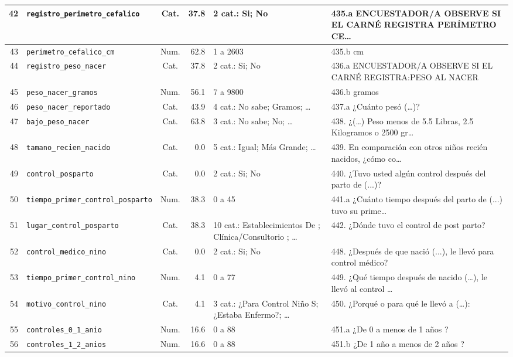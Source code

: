 \begin{longtable}{|r|p{3.1cm}|c|r|p{3.0cm}|p{3.8cm}|}
  42 & \texttt{registro\_perimetro\_cefalico} & Cat. & 37.8 & 2 cat.: Si; No & 435.a ENCUESTADOR/A OBSERVE SI EL CARNÉ REGISTRA PERÍMETRO CE… \\ \hline
  43 & \texttt{perimetro\_cefalico\_cm} & Num. & 62.8 & 1 a 2603 & 435.b cm \\ \hline
  44 & \texttt{registro\_peso\_nacer} & Cat. & 37.8 & 2 cat.: Si; No & 436.a ENCUESTADOR/A OBSERVE SI EL CARNÉ REGISTRA:PESO AL NACER \\ \hline
  45 & \texttt{peso\_nacer\_gramos} & Num. & 56.1 & 7 a 9800 & 436.b gramos \\ \hline
  46 & \texttt{peso\_nacer\_reportado} & Cat. & 43.9 & 4 cat.: No sabe; Gramos; … & 437.a ¿Cuánto pesó (…)? \\ \hline
  47 & \texttt{bajo\_peso\_nacer} & Cat. & 63.8 & 3 cat.: No sabe; No; … & 438.  ¿(…) Peso menos de 5.5 Libras, 2.5 Kilogramos o 2500 gr… \\ \hline
  48 & \texttt{tamano\_recien\_nacido} & Cat. & 0.0 & 5 cat.: Igual; Más Grande; … & 439.  En comparación con otros niños recién nacidos, ¿cómo co… \\ \hline
  49 & \texttt{control\_posparto} & Cat. & 0.0 & 2 cat.: Si; No & 440.  ¿Tuvo usted algún control después del parto de (...)? \\ \hline
  50 & \texttt{tiempo\_primer\_control\_posparto} & Num. & 38.3 & 0 a 45 & 441.a ¿Cuánto tiempo después del parto de (...) tuvo su prime… \\ \hline
  51 & \texttt{lugar\_control\_posparto} & Cat. & 38.3 & 10 cat.: Establecimientos De ; Clínica/Consultorio ; … & 442.  ¿Dónde tuvo el control de post parto? \\ \hline
  52 & \texttt{control\_medico\_nino} & Cat. & 0.0 & 2 cat.: Si; No & 448.  ¿Después de que nació (...), le llevó para control médico? \\ \hline
  53 & \texttt{tiempo\_primer\_control\_nino} & Num. & 4.1 & 0 a 77 & 449.  ¿Qué tiempo después de nacido (…), le llevó al control … \\ \hline
  54 & \texttt{motivo\_control\_nino} & Cat. & 4.1 & 3 cat.: ¿Para Control Niño S; ¿Estaba Enfermo?; … & 450.  ¿Porqué o para qué le llevó a (…): \\ \hline
  55 & \texttt{controles\_0\_1\_anio} & Num. & 16.6 & 0 a 88 & 451.a ¿De 0 a menos de 1 años ? \\ \hline
  56 & \texttt{controles\_1\_2\_anios} & Num. & 16.6 & 0 a 88 & 451.b ¿De 1 año a menos de 2 años ? \\ \hline

\end{longtable}
